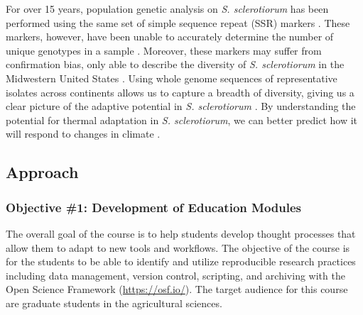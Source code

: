 \documentclass[12pt,letterpaper]{article}
\begin{document}
For over 15 years, population genetic analysis on \textit{S. sclerotiorum} has been performed using the same set of simple sequence repeat (SSR) markers \citep{sirjusingh2001characterization}. 
These markers, however, have been unable to accurately determine the number of unique genotypes in a sample \citep{lehner2017independently, lehner2017sclerotinia,arnaud2007standardizing}.
Moreover, these markers may suffer from confirmation bias, only able to describe the diversity of \textit{S. sclerotiorum} in the Midwestern United States \citep{attanayake2013sclerotinia}. 
Using whole genome sequences of representative isolates across continents allows us to capture a breadth of diversity, giving us a clear picture of the adaptive potential in \textit{S. sclerotiorum} \citep{grunwald2016population}.
By understanding the potential for thermal adaptation in \textit{S. sclerotiorum}, we can better predict how it will respond to changes in climate \citep{croll2016genetic}.


\subsection{Approach}


\subsubsection*{Objective \#1: Development of Education Modules}

The overall goal of the course is to help students develop thought processes that allow them to adapt to new tools and workflows. 
The objective of the course is for the students to be able to identify and utilize reproducible research practices including data management, version control, scripting, and archiving with the Open Science Framework (\url{https://osf.io/}).
The target audience for this course are graduate students in the agricultural sciences.
\end{document}
